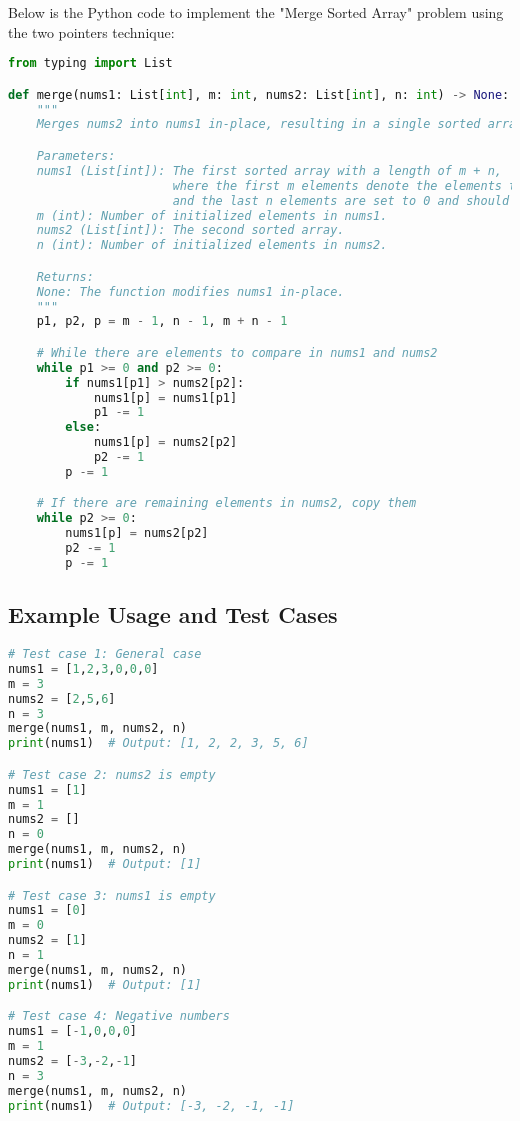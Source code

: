 Below is the Python code to implement the "Merge Sorted Array" problem using the two pointers technique:
\begin{fullwidth}
\begin{lstlisting}[language=Python]
from typing import List

def merge(nums1: List[int], m: int, nums2: List[int], n: int) -> None:
    """
    Merges nums2 into nums1 in-place, resulting in a single sorted array.

    Parameters:
    nums1 (List[int]): The first sorted array with a length of m + n,
                       where the first m elements denote the elements to merge,
                       and the last n elements are set to 0 and should be ignored.
    m (int): Number of initialized elements in nums1.
    nums2 (List[int]): The second sorted array.
    n (int): Number of initialized elements in nums2.

    Returns:
    None: The function modifies nums1 in-place.
    """
    p1, p2, p = m - 1, n - 1, m + n - 1

    # While there are elements to compare in nums1 and nums2
    while p1 >= 0 and p2 >= 0:
        if nums1[p1] > nums2[p2]:
            nums1[p] = nums1[p1]
            p1 -= 1
        else:
            nums1[p] = nums2[p2]
            p2 -= 1
        p -= 1

    # If there are remaining elements in nums2, copy them
    while p2 >= 0:
        nums1[p] = nums2[p2]
        p2 -= 1
        p -= 1
\end{lstlisting}
\end{fullwidth}
\subsection*{Example Usage and Test Cases}

\begin{lstlisting}[language=Python]
# Test case 1: General case
nums1 = [1,2,3,0,0,0]
m = 3
nums2 = [2,5,6]
n = 3
merge(nums1, m, nums2, n)
print(nums1)  # Output: [1, 2, 2, 3, 5, 6]

# Test case 2: nums2 is empty
nums1 = [1]
m = 1
nums2 = []
n = 0
merge(nums1, m, nums2, n)
print(nums1)  # Output: [1]

# Test case 3: nums1 is empty
nums1 = [0]
m = 0
nums2 = [1]
n = 1
merge(nums1, m, nums2, n)
print(nums1)  # Output: [1]

# Test case 4: Negative numbers
nums1 = [-1,0,0,0]
m = 1
nums2 = [-3,-2,-1]
n = 3
merge(nums1, m, nums2, n)
print(nums1)  # Output: [-3, -2, -1, -1]
\end{lstlisting}

